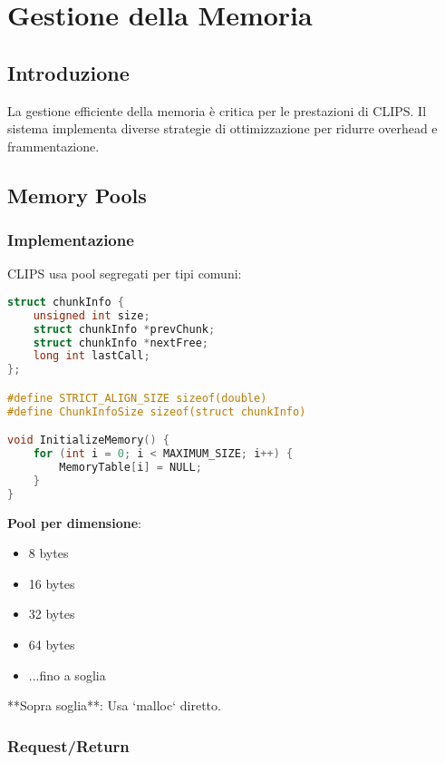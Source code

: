 
\chapter{Gestione della Memoria}
\label{cap:clips_memoria}

\section{Introduzione}

La gestione efficiente della memoria è critica per le prestazioni di CLIPS. Il sistema implementa diverse strategie di ottimizzazione per ridurre overhead e frammentazione.

\section{Memory Pools}

\subsection{Implementazione}

CLIPS usa pool segregati per tipi comuni:

\begin{lstlisting}[language=C]
struct chunkInfo {
    unsigned int size;
    struct chunkInfo *prevChunk;
    struct chunkInfo *nextFree;
    long int lastCall;
};

#define STRICT_ALIGN_SIZE sizeof(double)
#define ChunkInfoSize sizeof(struct chunkInfo)

void InitializeMemory() {
    for (int i = 0; i < MAXIMUM_SIZE; i++) {
        MemoryTable[i] = NULL;
    }
}
\end{lstlisting}

\textbf{Pool per dimensione}:
\begin{itemize}
\item 8 bytes
\item 16 bytes
\item 32 bytes
\item 64 bytes
\item ...fino a soglia
\end{itemize}

**Sopra soglia**: Usa `malloc` diretto.

\subsection{Request/Return}

